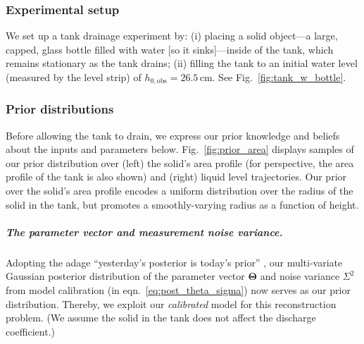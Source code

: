 \documentclass[a4paper,fleqn]{cas-dc}
\begin{document}
\subsubsection{Experimental setup}
We set up a tank drainage experiment by:
(i) placing a solid object---a large, capped, glass bottle filled with water [so it sinks]---inside of the tank, which remains stationary as the tank drains;
(ii) filling the tank to an initial water level (measured by the level strip) of $h_{0, \text{obs}}=26.5$\,cm. 
See Fig.~\ref{fig:tank_w_bottle}.


\subsubsection{Prior distributions}
Before allowing the tank to drain, we express our prior knowledge and beliefs about the inputs and parameters below.
Fig.~\ref{fig:prior_area} displays samples of our prior distribution over (left) the solid's area profile (for perspective, the area profile of the tank is also shown) and (right) liquid level trajectories. 
Our prior over the solid's area profile encodes a uniform distribution over the radius of the solid in the tank, but promotes a smoothly-varying radius as a function of height. 


\subparagraph{The parameter vector and measurement noise variance.}
Adopting the adage ``yesterday's posterior is today's prior'' \cite{calvetti2010subjective}, 
our multi-variate Gaussian posterior distribution of the parameter vector $\boldsymbol \Theta$ and noise variance $\Sigma^2$ from model calibration (in eqn.~\ref{eq:post_theta_sigma}) now serves as our prior distribution.
Thereby, we exploit our \emph{calibrated} model for this reconstruction problem.
(We assume the solid in the tank does not affect the discharge coefficient.)
\end{document}
